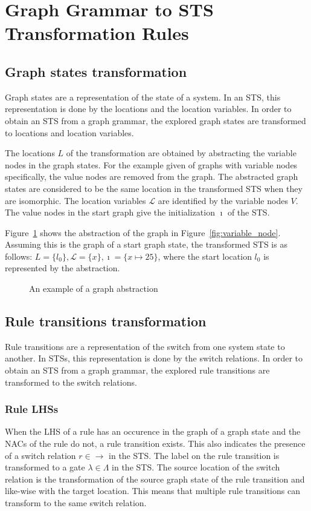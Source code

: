\section{Graph Grammar to STS Transformation Rules}\label{sec:gg-to-sts}

\subsection{Graph states transformation}
Graph states are a representation of the state of a system. In an STS, this representation is done by the locations and the location variables. In order to obtain an STS from a graph grammar, the explored graph states are transformed to locations and location variables. 

The locations $L$ of the transformation are obtained by abstracting the variable nodes in the graph states. For the example given of graphs with variable nodes specifically, the value nodes are removed from the graph. The abstracted graph states are considered to be the same location in the transformed STS when they are isomorphic. The location variables $\mathcal{L}$ are identified by the variable nodes $V$. The value nodes in the start graph give the initialization $\imath$ of the STS.

Figure~\ref{fig:abstract_graph} shows the abstraction of the graph in Figure~\ref{fig:variable_node}. Assuming this is the graph of a start graph state, the transformed STS is as follows: $L = \{l_0\}, \mathcal{L} = \{x\}, \imath = \{x \mapsto 25\}$, where the start location $l_0$ is represented by the abstraction.

\begin{figure}[ht]
  \begin{center}
    
  \end{center}
  \caption{An example of a graph abstraction}
  \label{fig:abstract_graph}
\end{figure}

\subsection{Rule transitions transformation}
Rule transitions are a representation of the switch from one system state to another. In STSs, this representation is done by the switch relations. In order to obtain an STS from a graph grammar, the explored rule transitions are transformed to the switch relations.

\subsubsection{Rule LHSs}\label{sec:rule_lhss}
When the LHS of a rule has an occurence in the graph of a graph state and the NACs of the rule do not, a rule transition exists. This also indicates the presence of a switch relation $r \in \rightarrow$ in the STS. The label on the rule transition is transformed to a gate $\lambda \in \Lambda$ in the STS. The source location of the switch relation is the transformation of the source graph state of the rule transition and like-wise with the target location. This means that multiple rule transitions can transform to the same switch relation.

